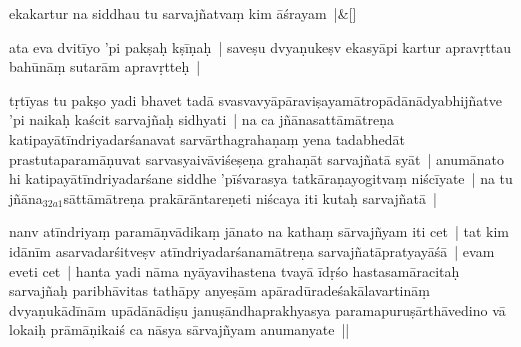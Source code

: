 \documentclass[article,12pt,a4paper]{memoir}%
\newcounter{parCount}
\begin{document}
	    
	    \stanza[\smallbreak]
	  \label{ratnakīrtinibandhāvali__36r1NMFLFX785HFFPE2O9XY3QCP}ekakartur na siddhau tu sarvajñatvaṃ kim āśrayam |\label{ratnakīrtinibandhāvali__36r1NMFLNZF26QG3OB18MFYZVHQ}\&[\smallbreak]
	  
	  
	  

	  \pstart \leavevmode%
	\label{thakur75-56.11}ata eva dvitīyo 'pi pakṣaḥ kṣīṇaḥ | saveṣu dvyaṇukeṣv ekasyāpi kartur apravṛttau bahūnāṃ sutarām apravṛtteḥ |
	{}
	\pend%
      

	  \pstart \leavevmode%
	\label{thakur75-56.13}tṛ\leavevmode{}\label{RNAms_32a}tīyas tu pakṣo yadi bhavet tadā svasvavyāpāraviṣayamātropādānādyabhijñatve 'pi naikaḥ kaścit sarvajñaḥ sidhyati | na ca \label{rnā__151710}jñānasattāmātreṇa\label{rnā__151759} katipayātīndriyadarśanavat sarvārthagrahaṇaṃ yena tadabhedāt prastutaparamāṇuvat sarvasyaivāviśeṣeṇa grahaṇāt sarvajñatā syāt | anumānato hi katipayātīndriyadarśane siddhe 'pīśvarasya tatkāraṇayogitvaṃ niścīyate | na tu jñāna{\tiny $_{32a1}$}sāttāmātreṇa prakārāntareṇeti niścaya iti kutaḥ sarvajñatā |
	{}
	\pend%
      

	  \pstart \leavevmode%
	\label{thakur75-56.19}nanv atīndriyaṃ paramāṇvādikaṃ jānato na kathaṃ sārvajñyam iti cet | tat kim idānīm asarvadarśitveṣv atīndriyadarśanamātreṇa sarvajñatāpratyayāśā | evam eveti cet | hanta yadi nāma nyāyavihastena tvayā īdṛśo hastasamāracitaḥ sarvajñaḥ paribhāvitas tathāpy anyeṣām apāradūradeśakālavartināṃ dvyaṇukādīnām upādānādiṣu januṣāndhaprakhyasya paramapuruṣārthāvedino vā lokaiḥ prāmāṇikaiś ca nāsya sārvajñyam anumanyate ||
	{}
	\pend%
      
\end{document}
